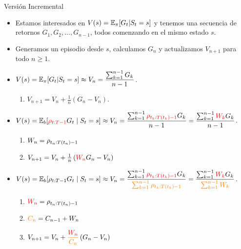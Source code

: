 \documentclass[10pt, envcountsect, handout, aspectratio=1610, hyperref={hypertexnames=true}]{beamer}
\begin{document}
\begin{frame}{Versión Incremental}
	\begin{itemize}
		\item Estamos interesados en $\displaystyle V(s)=\mathbb{E}_\pi[G_t|S_t=s]$ y tenemos una secuencia de retornos \(G_1, G_2, \ldots, G_{n-1}\), todos comenzando en el mismo estado $s$.
		
		\item Generamos un episodio desde $s$, calculamos $G_n$ y actualizamos $V_{n+1}$ para todo $n\geq 1$.

		\item {} $\displaystyle V(s)  =\mathbb{E}_\pi[G_t|S_t=s] \approx V_n=\frac{\sum_{k=1}^{n-1} G_k}{n-1}$.
		\begin{enumerate}
			\item $V_{n+1}= V_n + \frac{1}{n} \left(G_{n} - V_n\right)$.
		\end{enumerate}
		
		
		\item {} $\displaystyle V(s) = \mathbb{E}_b	[{\color{red} \rho_{t:T-1}} G_t \mid S_t = s] \approx  V_n=\frac{\sum_{k=1}^{n-1} {\color{red} \rho_{t_k:T(t_k)-1}} G_k}{n-1} =  \frac{\sum_{k=1}^{n-1} {\color{red} W_k} G_k}{n-1}$. 
		
		\begin{enumerate}
			\item \(W_{n} = {\large\rho}_{t_{n}:T(t_{n})-1}\) 
			\item $V_{n+1}=V_n + \frac{1}{n} \left( {\color{red} W_{n}} G_{n} - V_n \right )$
		\end{enumerate}
		
		\item  {}
		$\displaystyle V(s) =  \mathbb{E}_b	[\rho_{t:T-1} G_t \mid S_t = s] \approx V_n=\frac{\sum_{k=1}^{n-1} {\color{red} \rho_{t_k:T(t_k)-1}}  G_k}{\color{orange} \sum_{k=1}^{n-1} \rho_{t_k:T(t_k)-1}} =  \frac{\sum_{k=1}^{n-1} {\color{red} W_k} G_k}{\color{orange} \sum_{k=1}^{n-1} W_k}$.
		
		\begin{enumerate}
			\item \( {\color{red}W_{n}} = {\large\rho}_{t_{n}:T(t_{n})-1}\) 
			\item ${\color{orange} C_{n}} = C_{n-1} + W_{n}$
			\item $\displaystyle V_{n+1}=V_n + {\color{orange} \frac{{\color{red} W_{n}}}{C_{n}} } \left(  G_{n} - V_n \right )$
		\end{enumerate}
	\end{itemize} 

\end{frame}
\end{document}
